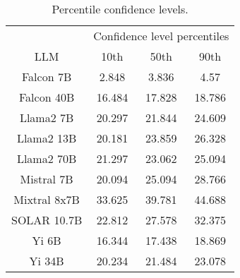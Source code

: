 \begin{table*}
\centering
\begin{tabular}{c|c|c|c}
& \multicolumn{3}{c}{Confidence level percentiles} \\ 
LLM & 10th & 50th & 90th\\ \hline
Falcon 7B & 2.848 & 3.836 & 4.57\\
Falcon 40B & 16.484 & 17.828 & 18.786\\
Llama2 7B & 20.297 & 21.844 & 24.609\\
Llama2 13B & 20.181 & 23.859 & 26.328\\
Llama2 70B & 21.297 & 23.062 & 25.094\\
Mistral 7B & 20.094 & 25.094 & 28.766\\
Mixtral 8x7B & 33.625 & 39.781 & 44.688\\
SOLAR 10.7B & 22.812 & 27.578 & 32.375\\
Yi 6B & 16.344 & 17.438 & 18.869\\
Yi 34B & 20.234 & 21.484 & 23.078\\
\hline
\end{tabular}
\caption{Percentile confidence levels.}
\label{tab:percentile_conf}
\end{table*}
